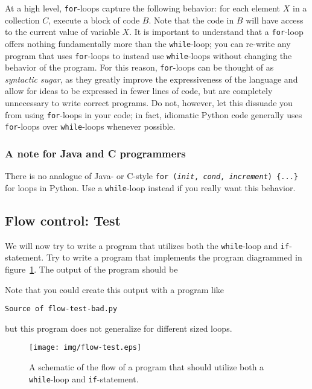 \documentclass{article}
\newcommand{\example}[1]{%
  \par
  \vspace{.5em}
  \noindent \texttt{Source of #1}
  
  \vspace{.5em}
}
\newcommand{\exampleoutput}[1]{%
  \par
  \vspace{.5em}
  
  \vspace{.5em}
}
\begin{document}
At a high level, \texttt{for}-loops capture the following behavior:
for each element $X$ in a collection $C$, execute a block of code
$B$. Note that the code in $B$ will have access to the current value
of variable $X$. It is important to understand that a
\texttt{for}-loop offers nothing fundamentally more than the
\texttt{while}-loop; you can re-write any program that uses
\texttt{for}-loops to instead use \texttt{while}-loops without
changing the behavior of the program. For this reason,
\texttt{for}-loops can be thought of as \textit{syntactic sugar}, as
they greatly improve the expressiveness of the language and allow for
ideas to be expressed in fewer lines of code, but are completely
unnecessary to write correct programs. Do not, however, let this
dissuade you from using \texttt{for}-loops in your code; in fact,
idiomatic Python code generally uses \texttt{for}-loops over
\texttt{while}-loops whenever possible.

\subsubsection{A note for Java and C programmers}

There is no analogue of Java- or C-style \texttt{for (\textit{init},
  \textit{cond}, \textit{increment}) \{...\}} for loops in Python. Use
a \texttt{while}-loop instead if you really want this behavior.

\subsection{Flow control: Test}

We will now try to write a program that utilizes both the
\texttt{while}-loop and \texttt{if}-statement. Try to write a program
that implements the program diagrammed in
figure~\ref{fig:flow-test}. The output of the program should be
\exampleoutput{flow-test-bad.out}
Note that you could create this output with a program like
\example{flow-test-bad.py}
but this program does not generalize for different sized loops.

\begin{figure}[htp]
  \centering
  
  \texttt{[image: img/flow-test.eps]}

  \caption{A schematic of the flow of a program that should utilize
    both a \texttt{while}-loop and \texttt{if}-statement.}
  \label{fig:flow-test}
\end{figure}
\end{document}
